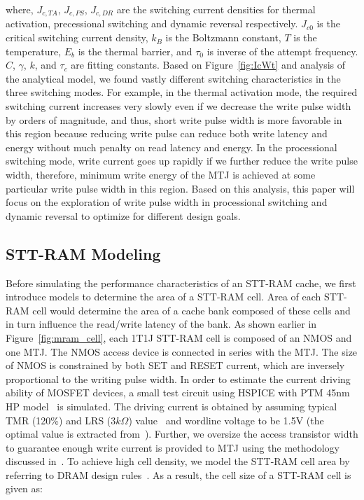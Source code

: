 where, $J_{c,TA}$, $J_{c,PS}$, $J_{c,DR}$ are the switching current densities for thermal activation,
precessional switching and dynamic reversal respectively. $J_{c0}$ is the critical switching current
density, $k_{B}$ is the Boltzmann constant, $T$ is the temperature, $E_{b}$ is the thermal barrier,
and $\tau_{0}$ is inverse of the attempt frequency. $C$, $\gamma$, $k$, and $\tau_{c}$ are fitting
constants. Based on Figure~\ref{fig:IcWt} and analysis of the analytical model, we found vastly
different switching characteristics in the three switching modes. For example, in the thermal
activation mode, the required switching current increases very slowly even if we decrease the write
pulse width by orders of magnitude, and thus, short write pulse width is more favorable in this
region because reducing write pulse can reduce both write latency and energy without much penalty on
read latency and energy. In the processional switching mode, write current goes up rapidly if we
further reduce the write pulse width, therefore, minimum write energy of the MTJ is achieved at some
particular write pulse width in this region. Based on this analysis, this paper will focus on the
exploration of write pulse width in processional switching and dynamic reversal to optimize for
different design goals.

\subsection{STT-RAM Modeling}

Before simulating the performance characteristics of an STT-RAM cache, we first introduce models to
determine the area of a STT-RAM cell. Area of each STT-RAM cell would determine the area of a cache
bank composed of these cells and in turn influence the read/write latency of the bank. As shown
earlier in Figure~\ref{fig:mram_cell}, each 1T1J STT-RAM cell is composed of an NMOS and one MTJ. The
NMOS access device is connected in series with the MTJ. The size of NMOS is constrained by both SET
and RESET current, which are inversely proportional to the writing pulse width. In order to estimate
the current driving ability of MOSFET devices, a small test circuit using HSPICE with PTM 45nm HP
model~\cite{PTM} is simulated. The driving current is obtained by assuming typical TMR (120\%) and
LRS ($3k\Omega$) value~\cite{STTRAM:Qualcomm09} and wordline voltage to be 1.5V (the optimal value is
extracted from~\cite{STTRAM:Gatech10}). Further, we oversize the access transistor width to guarantee
enough write current is provided to MTJ using the methodology discussed in~\cite{STTRAM:RPI10}. To
achieve high cell density, we model the STT-RAM cell area by referring to DRAM design
rules~\cite{DRAM:6F2}.  As a result, the cell size of a STT-RAM cell is given as:


